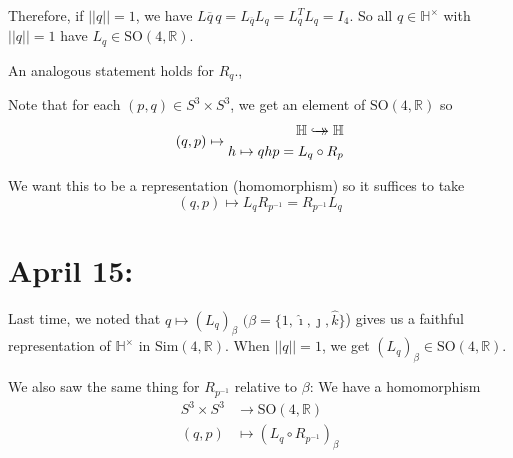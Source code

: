 \documentclass[12pt]{article}
\renewcommand{\hat}[1]{\widehat{#1}}
\newcommand{\R}{\mathbb{R}}
\renewcommand{\H}{\mathbb{H}}
\newcommand{\norm}[1]{\left\vert \left\vert #1 \right\vert \right\vert}
\newcommand{\SO}{\text{SO}}
\newcommand{\biject}{\hookrightarrow \hspace{-8pt} \rightarrow}
\newcommand{\ihat}{\hat{\imath}}
\newcommand{\jhat}{\hat{\jmath}}
\newcommand{\khat}{\hat{k}}
\renewcommand{\bar}{\overline}
\begin{document}
    Therefore, if $\norm{q} = 1$, we have $L{\bar q\, q} = L_{\bar q} L_q = L_q^T L_q = I_4$. So all $q \in \H^{\times}$ with $\norm{q} = 1$ have $L_q \in \SO(4, \R)$. 

    An analogous statement holds for $R_q$., 

    Note that for each $(p, q) \in S^3 \times S^3$, we get an element of $\SO(4, \R)$ so 
    \[(q, p) \mapsto \begin{aligned}
        \H \biject \H\\ 
        h \mapsto qhp = L_q \circ R_p
    \end{aligned}\]

    We want this to be a representation (homomorphism) so it suffices to take 
    \[(q, p) \mapsto L_q R_{p^{-1}} = R_{p^{-1}} L_q\] 

\section{April 15:}
    Last time, we noted that $q \mapsto (L_q)_{\beta}$ $(\beta = \{1, \ihat, \jhat, \khat\}$) gives us a faithful representation of $\H^{\times}$ in $\text{Sim}(4, \R)$. When $\norm{q} = 1$, we get $(L_q)_{\beta} \in \SO(4, \R)$. 

    We also saw the same thing for $R_{p^{-1}}$ relative to $\beta$: We have a homomorphism 
    \[\begin{aligned}
        S^3 \times S^3 &\to \SO(4, \R)\\ 
        (q, p) &\mapsto (L_q \circ R_{p^{-1}})_{\beta}
    \end{aligned}\]
\end{document}
